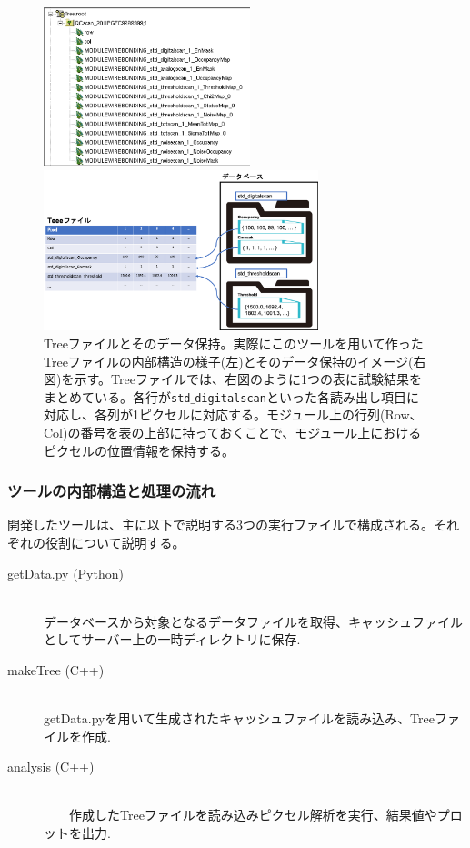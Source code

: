 \begin{figure}[bpt]
  \begin{minipage}{0.4\hsize}
    \begin{center}
    \includegraphics[width=6cm]{./analysis_tool_tree_file.png}
    \end{center}
  \end{minipage}
  \begin{minipage}{0.4\hsize}
    \begin{center}
    \includegraphics[width=8cm]{./analysis_tool_tree_image.png}
    \end{center}
  \end{minipage}
  \caption[Treeファイルとそのデータ保持]{Treeファイルとそのデータ保持。実際にこのツールを用いて作ったTreeファイルの内部構造の様子(左)とそのデータ保持のイメージ(右図)を示す。Treeファイルでは、右図のように1つの表に試験結果をまとめている。各行が\texttt{std$\_$digitalscan}といった各読み出し項目に対応し、各列が1ピクセルに対応する。モジュール上の行列(Row、Col)の番号を表の上部に持っておくことで、モジュール上におけるピクセルの位置情報を保持する。}
  \label{analysis_tool_tree}
\end{figure}

\subsubsection{ツールの内部構造と処理の流れ}
開発したツールは、主に以下で説明する3つの実行ファイルで構成される。それぞれの役割について説明する。

\begin{description}
  \item[getData.py (Python)]\mbox{}\\ 
    データベースから対象となるデータファイルを取得、キャッシュファイルとしてサーバー上の一時ディレクトリに保存.
  \item[makeTree (C++)]\mbox{}\\ 
    getData.pyを用いて生成されたキャッシュファイルを読み込み、Treeファイルを作成.
  \item[analysis (C++)]\mbox{}\\ 
　　作成したTreeファイルを読み込みピクセル解析を実行、結果値やプロットを出力.
\end{description}

